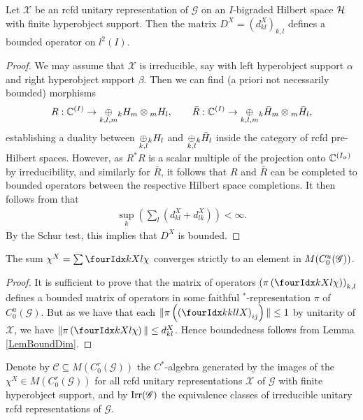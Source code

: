  \begin{Lem} \label{LemBoundDim} Let $\mathscr{X}$ be an rcfd unitary
   representation of $\mathscr{G}$ on an $I$-bigraded Hilbert space $\Hsp$ with finite hyperobject support. Then the matrix $D^X = (d^X_{kl})_{k,l}$ defines a bounded operator on $l^2(I)$. 
  \end{Lem}
  \begin{proof} We may assume that $\mathscr{X}$ is irreducible, say
    with left hyperobject support $\alpha$ and right hyperobject support
    $\beta$. Then we can find (a priori not necessarily bounded)
    morphisms \[R: \C^{(I)}\rightarrow \underset{k,l,m}{\oplus} \GrDA{H}{k}{m}\otimes
    \GrDA{H}{m}{l},\qquad \bar{R}: \C^{(I)} \rightarrow \underset{k,l,m}{\oplus}
    \GrDA{\bar{H}}{k}{m}\otimes \GrDA{\bar{H}}{m}{l},\] establishing a
    duality between $\underset{k,l}{\oplus} \GrDA{H}{k}{l}$ and
    $\underset{k,l}{\oplus}\GrDA{\bar{H}}{k}{l}$ inside the category of
    rcfd pre-Hilbert spaces. However, as $R^*R$ is a scalar multiple
    of the projection onto $\C^{(I_{\alpha})}$ by irreducibility, and
    similarly for $\bar{R}$, it follows that $R$ and $\bar{R}$ can be
    completed to bounded operators between the respective Hilbert
    space completions. It then follows from \cite[Lemma A.3.2]{DCY1}
    that 
    \begin{align} \label{eq:dim-estimate}
  \sup_k (\sum_l (d_{kl}^X+d_{lk}^X)) < \infty.    
    \end{align}
 By the Schur test,
    this implies that $D^X$ is bounded.
\end{proof} 


   
\begin{Lem} The sum $\chi^X  =\sum \Gr{\chi}{}{X}{k}{l}$ converges strictly to an element in $M(\CuG)$. 
\end{Lem} 
 
\begin{proof} It is sufficient to prove that the matrix of operators $\left(\pi\left(\Gr{\chi}{}{X}{k}{l}\right)\right)_{k,l}$ defines a bounded matrix of operators in some faithful $^*$-representation $\pi$ of $C^{u}_{0}(\mathscr{G})$. But as we have that each $\|\pi\left(\left(\Gr{X}{k}{l}{k}{l}\right)_{ij}\right)\|\leq 1$ by unitarity of $\mathscr{X}$, we have $\| \pi\left(\Gr{\chi}{}{X}{k}{l}\right)\| \leq d^X_{kl}$.  Hence boundedness follows from Lemma \ref{LemBoundDim}.
\end{proof} 

Denote by $\mathcal{C} \subseteq M(C_{0}^{r}(\mathscr{G}))$ the
$C^{*}$-algebra generated by the images of the $\chi^{X} \in
M(C_{0}^{r}(\mathscr{G}))$ for all rcfd unitary representations
$\mathscr{X}$ of $\mathscr{G}$ with finite hyperobject support, and by
 $\Irr(\mathscr{G})$ the equivalence classes of irreducible
unitary rcfd representations of $\mathscr{G}$.

